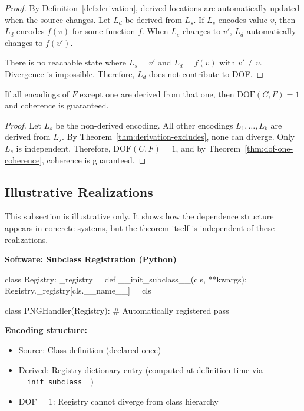 \begin{proof}
By Definition~\ref{def:derivation}, derived locations are automatically updated when the source changes. Let $L_d$ be derived from $L_s$. If $L_s$ encodes value $v$, then $L_d$ encodes $f(v)$ for some function $f$. When $L_s$ changes to $v'$, $L_d$ automatically changes to $f(v')$.

There is no reachable state where $L_s = v'$ and $L_d = f(v)$ with $v' \neq v$. Divergence is impossible. Therefore, $L_d$ does not contribute to DOF.
\end{proof}

\begin{corollary}\label{cor:metaprogramming}
If all encodings of $F$ except one are derived from that one, then $\text{DOF}(C, F) = 1$ and coherence is guaranteed.
\end{corollary}

\begin{proof}
Let $L_s$ be the non-derived encoding. All other encodings $L_1, \ldots, L_k$ are derived from $L_s$. By Theorem~\ref{thm:derivation-excludes}, none can diverge. Only $L_s$ is independent. Therefore, $\text{DOF}(C, F) = 1$, and by Theorem~\ref{thm:dof-one-coherence}, coherence is guaranteed.
\end{proof}

\subsection{Illustrative Realizations}\label{sec:ssot-patterns}

This subsection is illustrative only. It shows how the dependence structure appears in concrete systems, but the theorem itself is independent of these realizations.

\textbf{Software: Subclass Registration (Python)}

\begin{code}
class Registry:
    _registry = {}
    def __init_subclass__(cls, **kwargs):
        Registry._registry[cls.__name__] = cls

class PNGHandler(Registry):  # Automatically registered
    pass
\end{code}

\textbf{Encoding structure:}
\begin{itemize}
\tightlist
\item Source: Class definition (declared once)
\item Derived: Registry dictionary entry (computed at definition time via \texttt{\_\_init\_subclass\_\_})
\item DOF = 1: Registry cannot diverge from class hierarchy
\end{itemize}

